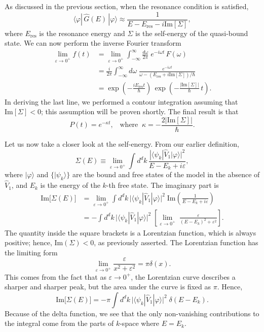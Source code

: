 \documentclass[pra,12pt]{revtex4}
\begin{document}
As discussed in the previous section, when the resonance condition is
satisfied,
$$ \langle\varphi|\,\hat{G}(E)\,|\varphi\rangle \approx \frac{1}{\displaystyle E - E_{\mathrm{res}} - i \mathrm{Im}[\Sigma]},$$
where $E_{\mathrm{res}}$ is the resonance energy and $\Sigma$ is the
self-energy of the quasi-bound state.  We can now perform the
inverse Fourier transform
$$\begin{aligned} \lim_{\varepsilon\rightarrow 0^+} f(t) &= \lim_{\varepsilon\rightarrow 0^+} \int_{-\infty}^{\infty} \frac{d\omega}{2\pi} \; e^{-i\omega t} \, F(\omega) \\ &= \frac{i}{2\pi} \int_{-\infty}^{\infty} d\omega\; \frac{e^{-i\omega t}}{\omega - (E_{\mathrm{res}}+i \mathrm{Im}[\Sigma])/\hbar}\\ &= \exp\left(-\frac{iE_{\mathrm{res}}t}{\hbar}\right)\, \exp\left(-\frac{|\mathrm{Im}[\Sigma]|}{\hbar}\,t\right). \end{aligned}$$
In deriving the last line, we performed a contour integration assuming
that $\mathrm{Im}[\Sigma] < 0$; this assumption will be proven
shortly.  The final result is that
$$P(t) = e^{-\kappa t}, \;\;\;\mathrm{where}\;\;\kappa = -\frac{2|\mathrm{Im}[\Sigma]|}{\hbar}.$$

Let us now take a closer look at the self-energy.  From our earlier
definition,
$$\Sigma(E) \equiv \lim_{\varepsilon\rightarrow0^+} \int d^dk\, \frac{\displaystyle| \langle\psi_k| \hat{V}_1|\varphi\rangle|^2}{\displaystyle E-E_k+i\varepsilon},$$
where $|\varphi\rangle$ and $\{|\psi_k\rangle\}$ are the bound and
free states of the model in the absence of $\hat{V}_1$, and $E_k$ is
the energy of the $k$-th free state.  The imaginary part is
$$\begin{aligned}\mathrm{Im}\big[\Sigma(E)\big] &= \lim_{\varepsilon\rightarrow0^+} \int d^dk\, \Big| \langle\psi_k| \hat{V}_1|\varphi\rangle\Big|^2 \; \mathrm{Im}\left( \frac{1}{\displaystyle E-E_k+i\varepsilon}\right) \\ &= - \int d^dk\, \Big| \langle\psi_k| \hat{V}_1|\varphi\rangle\Big|^2 \; \left[ \lim_{\varepsilon\rightarrow0^+} \; \frac{\varepsilon}{\displaystyle (E-E_k)^2 + \varepsilon^2}\right].\end{aligned}$$
The quantity inside the square brackets is a Lorentzian function,
which is always positive; hence, $\mathrm{Im}(\Sigma) < 0$, as
previously asserted.  The Lorentzian function has the limiting form
$$\lim_{\varepsilon\rightarrow 0^+} \frac{\varepsilon}{x^2+\varepsilon^2} = \pi\delta(x).$$
This comes from the fact that as $\varepsilon\rightarrow0^+$, the
Lorentzian curve describes a sharper and sharper peak, but the area
under the curve is fixed as $\pi$.  Hence,
$$\mathrm{Im}\big[\Sigma(E)\big] = - \pi \int d^dk\, \Big| \langle\psi_k| \hat{V}_1|\varphi\rangle\Big|^2 \; \delta(E-E_k).$$
Because of the delta function, we see that the only non-vanishing
contributions to the integral come from the parts of $k$-space where
$E = E_k$.
\end{document}
